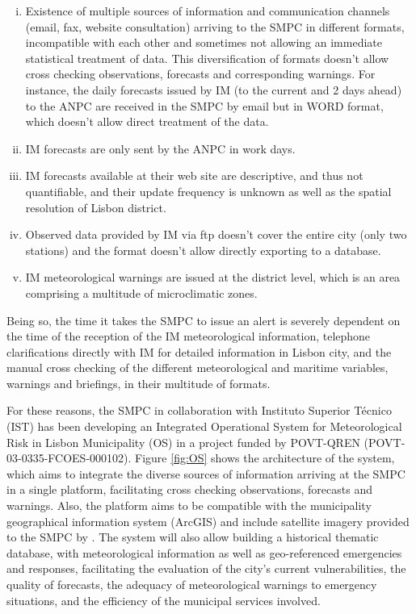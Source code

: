 \begin{enumerate}[i.]
    \item Existence of multiple sources of information and communication channels (email, fax, website consultation) arriving to the SMPC in different formats, incompatible with each other and sometimes not allowing an immediate statistical treatment of data. This diversification of formats doesn't allow cross checking observations, forecasts and corresponding warnings. For instance, the daily forecasts issued by IM (to the current and 2 days ahead) to the ANPC are received in the SMPC by email but in WORD format, which doesn't allow direct treatment of the data. 

    \item IM forecasts are only sent by the ANPC in work days.

    \item IM forecasts available at their web site are descriptive, and thus not quantifiable, and their update frequency is unknown as well as the spatial resolution of Lisbon district.

    \item Observed data provided by IM via ftp doesn't cover the entire city (only two stations) and the format doesn't allow directly exporting to a database.  

    \item IM meteorological warnings are issued at the district level, which is an area comprising a multitude of microclimatic zones. 
\end{enumerate}

Being so, the time it takes the SMPC to issue an alert is severely dependent on the time of the reception of the IM meteorological information, telephone clarifications directly with IM for detailed information in Lisbon city, and the manual cross checking of the different meteorological and maritime variables, warnings and briefings, in their multitude of formats. 

For these reasons, the SMPC in collaboration with Instituto Superior Técnico (IST) has been developing an Integrated Operational System for Meteorological Risk in Lisbon Municipality (OS) in a project funded by POVT-QREN (POVT-03-0335-FCOES-000102). Figure \ref{fig:OS} shows the architecture of the system, which aims to integrate the diverse sources of information arriving at the SMPC in a single platform, facilitating cross checking  observations, forecasts and warnings. Also, the platform aims to be compatible with the municipality geographical information system (ArcGIS) and include satellite imagery provided to the SMPC by \cite{ESAUHI}. The system will also allow building a historical thematic database, with meteorological information as well as geo-referenced emergencies and responses, facilitating the evaluation of the city's current vulnerabilities, the quality of forecasts, the adequacy of meteorological warnings to emergency situations, and the efficiency of the municipal services involved.

